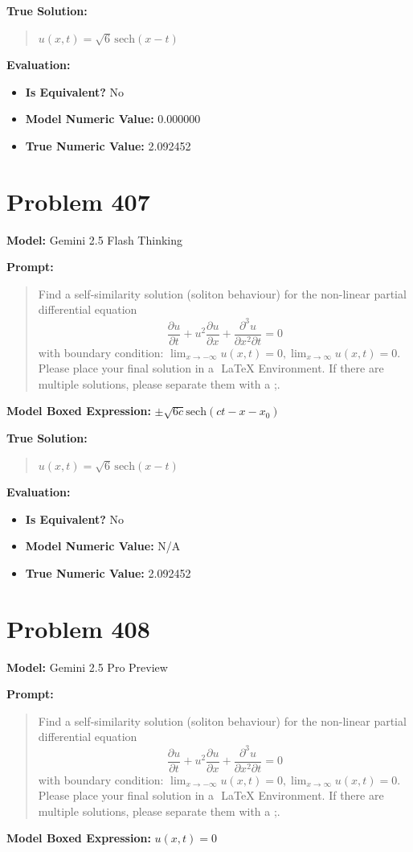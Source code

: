 \documentclass{article}
\begin{document}
\textbf{True Solution:}
\begin{quote}
$u(x,t)= \sqrt{6} \, \mathrm{sech}(x-t)$
\end{quote}

\textbf{Evaluation:}
\begin{itemize}
\item \textbf{Is Equivalent?} No
\item \textbf{Model Numeric Value:} 0.000000
\item \textbf{True Numeric Value:} 2.092452
\end{itemize}
\vspace{1cm}
\section*{Problem 407}
\textbf{Model:} Gemini 2.5 Flash Thinking

\textbf{Prompt:}
\begin{quote}
Find a self-similarity solution (soliton behaviour) for the non-linear partial differential equation $$\frac{\partial u}{\partial t} + u^2 \frac{\partial u}{\partial x} + \frac{\partial^3 u}{\partial x^2 \partial t} = 0$$ with boundary condition: $\lim_{x \to -\infty} u(x,t) = 0,\lim_{x \to \infty} u(x,t) = 0$. Please place your final solution in a $\boxed{}$ LaTeX Environment. If there are multiple solutions, please separate them with a ;.
\end{quote}
\textbf{Model Boxed Expression:} $\pm\sqrt{6c}\text{sech}(ct-x-x_0)$

\textbf{True Solution:}
\begin{quote}
$u(x,t)= \sqrt{6} \, \mathrm{sech}(x-t)$
\end{quote}

\textbf{Evaluation:}
\begin{itemize}
\item \textbf{Is Equivalent?} No
\item \textbf{Model Numeric Value:} N/A
\item \textbf{True Numeric Value:} 2.092452
\end{itemize}
\vspace{1cm}
\section*{Problem 408}
\textbf{Model:} Gemini 2.5 Pro Preview

\textbf{Prompt:}
\begin{quote}
Find a self-similarity solution (soliton behaviour) for the non-linear partial differential equation $$\frac{\partial u}{\partial t} + u^2 \frac{\partial u}{\partial x} + \frac{\partial^3 u}{\partial x^2 \partial t} = 0$$ with boundary condition: $\lim_{x \to -\infty} u(x,t) = 0,\lim_{x \to \infty} u(x,t) = 0$. Please place your final solution in a $\boxed{}$ LaTeX Environment. If there are multiple solutions, please separate them with a ;.
\end{quote}
\textbf{Model Boxed Expression:} $u(x,t) = 0$
\end{document}
